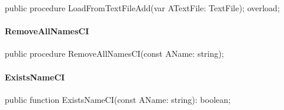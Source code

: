 \documentclass{report}
\newif\ifpdf
\begin{document}
\label{PasDoc_StringVector.TStringVector-LoadFromTextFileAdd}
\begin{list}{}{
\setlength{\itemindent}{0cm}
\setlength{\listparindent}{0cm}
\setlength{\leftmargin}{\evensidemargin}
\addtolength{\leftmargin}{\tmplength}
\settowidth{\labelsep}{X}
\addtolength{\leftmargin}{\labelsep}
\setlength{\labelwidth}{\tmplength}
}
\item[\textbf{Declaration}\hfill]
\ifpdf
\begin{flushleft}
\fi
\begin{ttfamily}
public procedure LoadFromTextFileAdd(var ATextFile: TextFile); overload;\end{ttfamily}

\ifpdf
\end{flushleft}
\fi

\end{list}
\paragraph*{RemoveAllNamesCI}\hspace*{\fill}

\label{PasDoc_StringVector.TStringVector-RemoveAllNamesCI}
\begin{list}{}{
\setlength{\itemindent}{0cm}
\setlength{\listparindent}{0cm}
\setlength{\leftmargin}{\evensidemargin}
\addtolength{\leftmargin}{\tmplength}
\settowidth{\labelsep}{X}
\addtolength{\leftmargin}{\labelsep}
\setlength{\labelwidth}{\tmplength}
}
\item[\textbf{Declaration}\hfill]
\ifpdf
\begin{flushleft}
\fi
\begin{ttfamily}
public procedure RemoveAllNamesCI(const AName: string);\end{ttfamily}

\ifpdf
\end{flushleft}
\fi

\end{list}
\paragraph*{ExistsNameCI}\hspace*{\fill}

\label{PasDoc_StringVector.TStringVector-ExistsNameCI}
\begin{list}{}{
\setlength{\itemindent}{0cm}
\setlength{\listparindent}{0cm}
\setlength{\leftmargin}{\evensidemargin}
\addtolength{\leftmargin}{\tmplength}
\settowidth{\labelsep}{X}
\addtolength{\leftmargin}{\labelsep}
\setlength{\labelwidth}{\tmplength}
}
\item[\textbf{Declaration}\hfill]
\ifpdf
\begin{flushleft}
\fi
\begin{ttfamily}
public function ExistsNameCI(const AName: string): boolean;\end{ttfamily}

\ifpdf
\end{flushleft}
\fi

\end{list}
\end{document}
